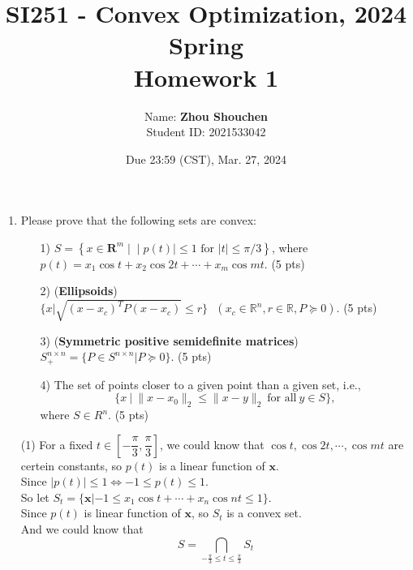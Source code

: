 \documentclass[10pt]{article}
\renewcommand{\mathbf}{\boldsymbol}
\begin{document}
\title{	SI251 - Convex Optimization, 2024 Spring\\Homework 1}
\date{Due 23:59 (CST), Mar. 27, 2024 }

\author{
    Name: \textbf{Zhou Shouchen} \\
	Student ID: 2021533042
}

\maketitle

\newpage


\begin{enumerate}

\section{Convex sets}
\item  Please prove that the following sets are convex: 
\begin{itemize}
    \item[1)] $S=\left\{x \in \mathbf{R}^m \;|\;\mid p(t) \mid \leq 1 \text { for }|t| \leq \pi / 3\right\}$, where $p(t)=x_1 \cos t+x_2 \cos 2 t+\cdots+x_m \cos m t$. {\color{red} (5 pts)}
    \item[2)] (\textbf{Ellipsoids}) $\Big\{x|\sqrt{(x-x_c)^TP(x-x_c)}\leq r\Big\}~~~(x_c\in \mathbb{R}^n, r\in \mathbb{R}, P\succeq 0)$. {\color{red} (5 pts)}
    \item[3)] (\textbf{Symmetric positive semidefinite matrices}) $S_{+}^{n\times n}=\Big\{ P\in S^{n\times n}|P\succeq 0\Big\}$. {\color{red} (5 pts)}
    \item[4)] The set of points closer to a given point than a given set, i.e.,
    \begin{equation*}
        \Big\{x~\vert~\|x-x_0\|_2\leq\|x-y\|_2~\text{for all}~y\in S\Big\},
    \end{equation*}
    where $S\in R^n$. {\color{red} (5 pts)}
\end{itemize}

(1) For a fixed $t\in [-\dfrac{\pi}{3},\dfrac{\pi}{3}]$, we could know that $\cos t, \cos 2t,\cdots,\cos mt$ are certein constants, so $p(t)$ is a linear function of $\mathbf{x}$.\\
Since $|p(t)|\leq 1 \Leftrightarrow -1\leq p(t)\leq 1$.\\
So let $S_t=\{\mathbf{x}|-1\leq x_1\cos t+\cdots+x_n\cos nt \leq 1\}$.\\
Since $p(t)$ is linear function of $\mathbf{x}$, so $S_t$ is a convex set.\\
And we could know that 
$$S=\bigcap_{-\frac{\pi}{3}\leq t\leq\frac{\pi}{3}}S_t$$


\end{enumerate}
\end{document}
